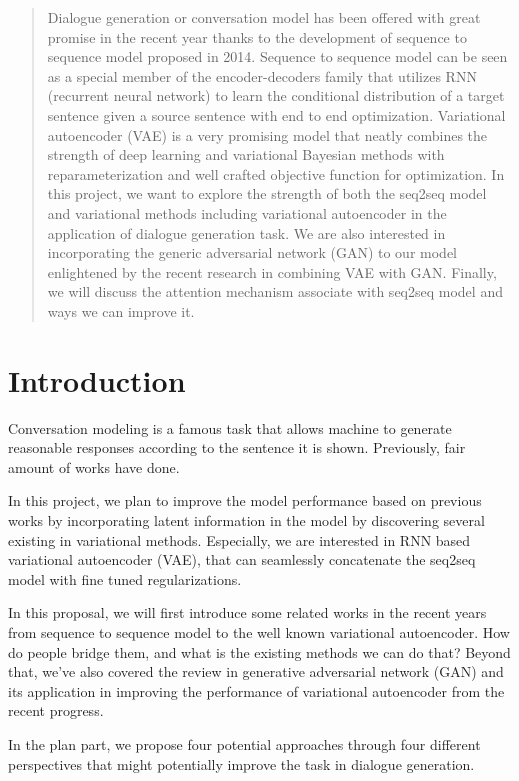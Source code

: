 \documentclass{article}
\begin{document}
\begin{abstract} 
Dialogue generation or conversation model has been offered with great promise in the recent year thanks to the development of sequence to sequence model proposed in 2014. Sequence to sequence model can be seen as a special member of the encoder-decoders family that utilizes RNN (recurrent neural network) to learn the conditional distribution of a target sentence given a source sentence with end to end optimization. Variational autoencoder (VAE) is a very promising model that neatly combines the strength of deep learning and variational Bayesian methods with reparameterization and well crafted objective function for optimization. In this project, we want to explore the strength of both the seq2seq model and variational methods including variational autoencoder  in the application of dialogue generation task. We are also interested in incorporating the generic adversarial network (GAN) to our model enlightened by the recent research in combining VAE with GAN. Finally, we will discuss the attention mechanism associate with seq2seq model and ways we can improve it.
\end{abstract} 

\section{Introduction}
Conversation modeling is a famous task that allows machine to generate reasonable responses according to the sentence it is shown. Previously, fair amount of works have done.

In this project, we plan to improve the model performance based on previous works by incorporating latent information in the model by discovering several existing in variational methods. Especially, we are interested in RNN based variational autoencoder (VAE), that can seamlessly concatenate the seq2seq model with fine tuned regularizations.

In this proposal, we will first introduce some related works in the recent years from sequence to sequence model to the well known variational autoencoder. How do people bridge them, and what is the existing methods we can do that? Beyond that, we've also covered the review in generative adversarial network (GAN) and its application in improving the performance of variational autoencoder from the recent progress. 

In the plan part, we propose four potential approaches through four different perspectives that might potentially improve the task in dialogue generation.
\end{document}
